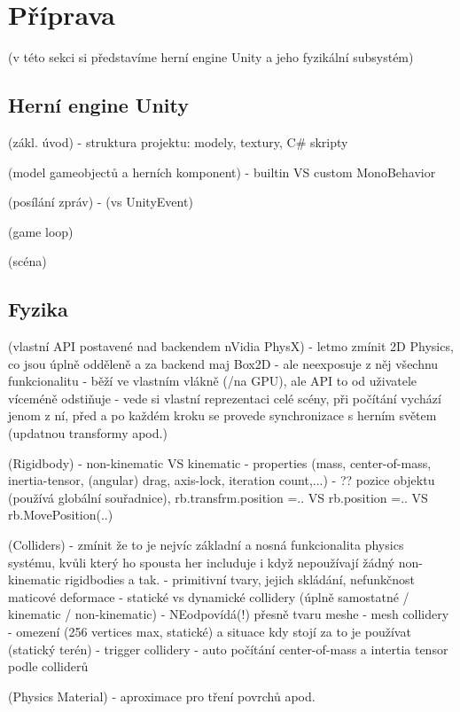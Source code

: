 \chapter{Příprava}
(v této sekci si představíme herní engine Unity a jeho fyzikální subsystém)

\section{Herní engine Unity}

(zákl. úvod)
- struktura projektu: modely, textury, C\# skripty

(model gameobjectů a herních komponent)
- builtin VS custom MonoBehavior

(posílání zpráv)
- (vs UnityEvent)

(game loop)

(scéna)



\section{Fyzika}

(vlastní API postavené nad backendem nVidia PhysX)
- letmo zmínit 2D Physics, co jsou úplně odděleně a za backend maj Box2D 
- ale neexposuje z něj všechnu funkcionalitu
- běží ve vlastním vlákně (/na GPU), ale API to od uživatele víceméně odstiňuje
- vede si vlastní reprezentaci celé scény, při počítání vychází jenom z ní, před a po každém kroku se provede synchronizace s herním světem (updatnou transformy apod.)

(Rigidbody)
- non-kinematic VS kinematic
- properties (mass, center-of-mass, inertia-tensor, (angular) drag, axis-lock, iteration count,...)
- ?? pozice objektu (používá globální souřadnice), rb.transfrm.position =.. VS rb.position =.. VS rb.MovePosition(..)

(Colliders)
- zmínit že to je nejvíc základní a nosná funkcionalita physics systému, kvůli který ho spousta her includuje i když nepoužívají žádný non-kinematic rigidbodies a tak.  
- primitivní tvary, jejich skládání, nefunkčnost maticové deformace
- statické vs dynamické collidery (úplně samostatné / kinematic / non-kinematic)
- NEodpovídá(!) přesně tvaru meshe
- mesh collidery - omezení (256 vertices max, statické) a situace kdy stojí za to je používat (statický terén)
- trigger collidery
- auto počítání center-of-mass a intertia tensor podle colliderů

(Physics Material)
- aproximace pro tření povrchů apod.


